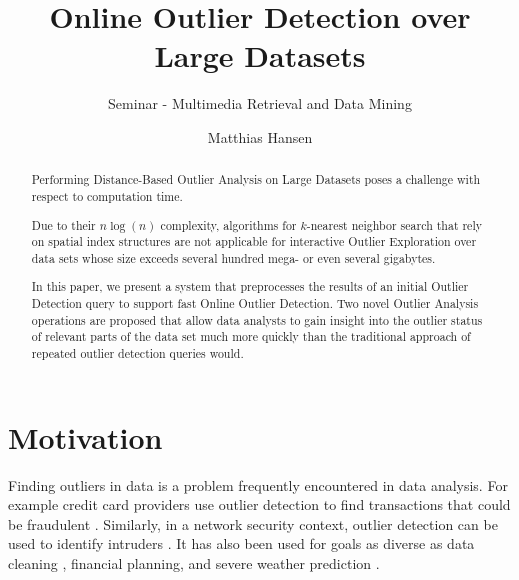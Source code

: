\documentclass[runningheads]{llncs}
\begin{document}
%
%
%
%
%
\title{Online Outlier Detection over Large Datasets}
\subtitle{Seminar - Multimedia Retrieval and Data Mining}
%
\author{Matthias Hansen}
%
%

\maketitle              %

\begin{abstract}
Performing Distance-Based Outlier Analysis on Large Datasets poses a challenge with respect to computation time. 

Due to their $n\log(n)$ complexity, algorithms for $k$-nearest neighbor search that rely on spatial index structures are not applicable for interactive Outlier Exploration over data sets whose size exceeds several hundred mega- or even several gigabytes. 

In this paper, we present a system that preprocesses the results of an initial Outlier Detection query to support fast Online Outlier Detection. Two novel Outlier Analysis operations are proposed that allow data analysts to gain insight into the outlier status of relevant parts of the data set much more quickly than the traditional approach of repeated outlier detection queries would.
\end{abstract}
\section{Motivation}
Finding outliers in data is a problem frequently encountered in data analysis. For example credit card providers use outlier detection to find transactions that could be fraudulent \cite{creditfraud}. Similarly, in a network security context, outlier detection can be used to identify intruders \cite{intrusion}. It has also been used for goals as diverse as data cleaning \cite{datacleaning}, financial planning, and severe weather prediction \cite{weather}.
\end{document}
